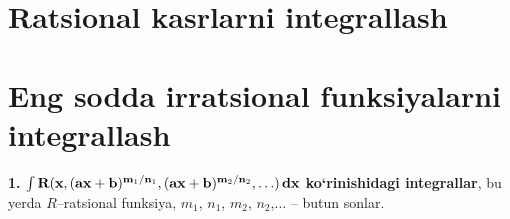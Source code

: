 \section{Ratsional kasrlarni integrallash}

\section{Eng sodda irratsional funksiyalarni integrallash}
\textbf{1.} $\int \textbf{R}(\textbf{x}, (\textbf{\textbf{ax}}+\textbf{b})^{\textbf{m}_{1}/\textbf{n}_{1}}, (\textbf{ax}+\textbf{b})^{\textbf{m}_{2}/\textbf{n}_{2}}, \ldots)\,\textbf{dx}$ \textbf{ko`rinishidagi integrallar}, bu yerda $R$--ratsional funksiya, $m_1$, $n_1$, $m_2$, $n_2$,$\ldots$ -- butun sonlar. 
